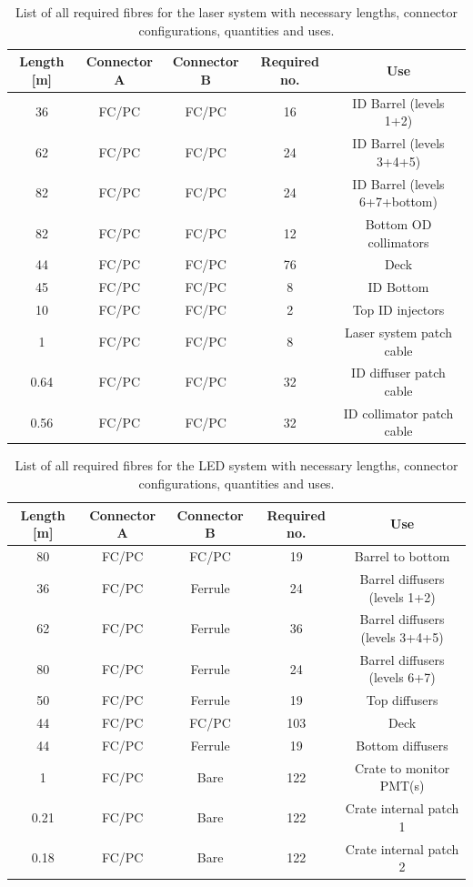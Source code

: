 \documentclass[a4paper,11pt]{article}
\begin{document}
\begin{table}[h]
\centering
\setlength{\tabcolsep}{4pt}
\begin{tabular}{ccccc}
\toprule
Length [m]	&	Connector A	&	Connector B	&	Required no.	&	Use		\\ \midrule
36			&	FC/PC		&	FC/PC			&	16				&	ID Barrel (levels 1+2) \\
62			&	FC/PC		&	FC/PC			&	24				&	ID Barrel (levels 3+4+5)	\\
82			&	FC/PC		&	FC/PC			&	24				&	ID Barrel (levels 6+7+bottom)	\\
82			&	FC/PC		&	FC/PC		&	12				&	Bottom OD collimators \\
44			&	FC/PC		&	FC/PC		&	76				&	Deck	\\
45			&	FC/PC			&	FC/PC			&	8				&	ID Bottom	\\
10			&	FC/PC		&	FC/PC			&	2				&	Top ID injectors \\
1			&	FC/PC		&	FC/PC		&	8				&	Laser system patch cable \\
0.64		&	FC/PC			&	FC/PC		&	32				&	ID diffuser patch cable	\\
0.56		&	FC/PC			&	FC/PC		&	32				&	ID collimator patch cable	\\ 
\bottomrule
\end{tabular}
\caption{List of all required fibres for the laser system with necessary lengths, connector configurations, quantities and uses.}\label{tab:fibreSummaryLaser}
\end{table}

\begin{table}[h]
\centering
\setlength{\tabcolsep}{4pt}
\begin{tabular}{ccccc}
\toprule
Length [m]	&	Connector A	&	Connector B	&	Required no.	&	Use		\\ \midrule
80			&	FC/PC		&	FC/PC			&	19				&	Barrel to bottom	\\
36			&	FC/PC		&	Ferrule		&	24				&	Barrel diffusers (levels 1+2) \\
62			&	FC/PC		&	Ferrule		&	36				&	Barrel diffusers (levels 3+4+5)	\\
80			&	FC/PC		&	Ferrule		&	24				&	Barrel diffusers (levels 6+7)	\\
50			&	FC/PC		&	Ferrule		&	19				&	Top diffusers \\
44			&	FC/PC		&	FC/PC		&	103				&	Deck		\\
44			&	FC/PC			&	Ferrule		&	19				&	Bottom diffusers	\\
1			&	FC/PC		&	Bare		&	122				&	Crate to monitor PMT(s)	\\
0.21		&	FC/PC		&	Bare		&	122				&	Crate internal patch 1	\\
0.18		&	FC/PC		&	Bare		&	122				&	Crate internal patch 2 \\ 
\bottomrule
\end{tabular}
\caption{List of all required fibres for the LED system with necessary lengths, connector configurations, quantities and uses.}\label{tab:fibreSummaryLED}
\end{table}
\end{document}
